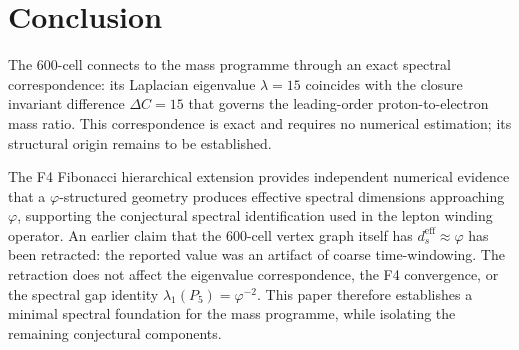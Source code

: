\documentclass[12pt]{article}
\newcommand{\phig}{\varphi}
\newcommand{\dseff}{d_s^{\mathrm{eff}}}
\begin{document}
\section{Conclusion}\label{sec:conclusion}

The 600-cell connects to the mass programme through an exact spectral correspondence: its Laplacian eigenvalue $\lambda = 15$ coincides with the closure invariant difference $\Delta C = 15$ that governs the leading-order proton-to-electron mass ratio. This correspondence is exact and requires no numerical estimation; its structural origin remains to be established.

The F4 Fibonacci hierarchical extension provides independent numerical evidence that a $\phig$-structured geometry produces effective spectral dimensions approaching $\phig$, supporting the conjectural spectral identification used in the lepton winding operator. An earlier claim that the 600-cell vertex graph itself has $\dseff \approx \phig$ has been retracted: the reported value was an artifact of coarse time-windowing. The retraction does not affect the eigenvalue correspondence, the F4 convergence, or the spectral gap identity $\lambda_1(P_5) = \phig^{-2}$. This paper therefore establishes a minimal spectral foundation for the mass programme, while isolating the remaining conjectural components.



\end{document}

